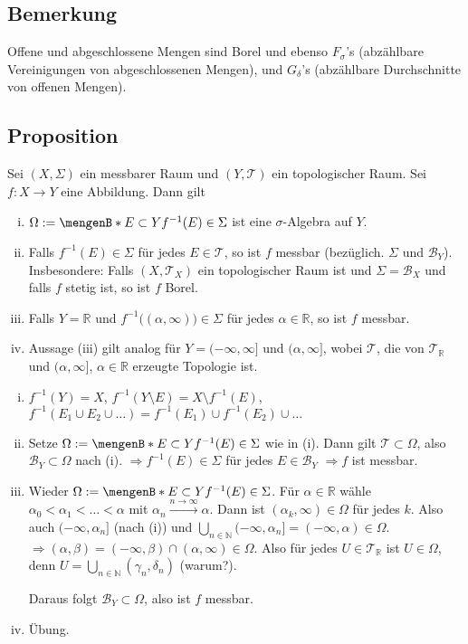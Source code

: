 \subsection[Bemerkung, welche Mengen Borel sind]{Bemerkung} %
\label{sub:97}
Offene und abgeschlossene Mengen sind Borel und ebenso $F_\sigma$'s (abzählbare Vereinigungen von abgeschlossenen Mengen), und $G_\delta$'s (abzählbare Durchschnitte von 
offenen Mengen).

\subsection[Proposition über Abbildungen zwischen topologischen und messbaren Räumen]{Proposition} %
\label{sub:98}
Sei $(X, \Sigma)$ ein messbarer Raum und $(Y, \mathcal{T} )$ ein topologischer Raum. Sei $f : X \to Y$ eine Abbildung. Dann gilt
\begin{enumerate}[(i)]
	\item $\Omega := \set[E \subset Y]{f ^{-1}(E) \in \Sigma} $ ist eine $\sigma$-Algebra auf $Y$.
	\item Falls $f ^{-1}(E) \in \Sigma$ für jedes $E \in \mathcal{T} $, so ist $f$ messbar (bezüglich. $\Sigma$ und $\mathcal{B}_Y$). Insbesondere: Falls 
	$(X, \mathcal{T}_X)$ ein topologischer Raum ist und $\Sigma = \mathcal{B}_X$ und falls $f$ stetig ist, so ist $f$ Borel.
	\item Falls $Y=\mathds{R}$ und $f ^{-1}\big( (\alpha, \infty)\big) \in \Sigma$ für jedes $\alpha \in \mathds{R}$, so ist $f$ messbar.
	\item Aussage (iii) gilt analog für $Y= (-\infty, \infty]$ und $(\alpha, \infty]$, wobei $\mathcal{T} $, die von $\mathcal{T}_\mathds{R}$ und $(\alpha, \infty]$, 
	$\alpha \in \mathds{R}$ erzeugte Topologie ist.
\end{enumerate}
\begin{enumerate}[(i)]
	\item $f ^{-1}(Y) =X$, $f ^{-1}(Y \setminus E) = X \setminus f ^{-1}(E)$, $f ^{-1}( E_1 \cup E_2 \cup \ldots ) = f ^{-1}(E_1) \cup f ^{-1}(E_2) \cup \ldots $
	\item Setze $\Omega := \set[E \subset Y]{f ^{-1}(E) \in \Sigma}$ wie in (i). Dann gilt $\mathcal{T}  \subset \Omega$, also $\mathcal{B}_Y \subset \Omega$ nach (i).
	$\Rightarrow f ^{-1}(E) \in \Sigma$ für jedes $E \in \mathcal{B}_Y$ $\Rightarrow f $ ist messbar.
	\item Wieder $\Omega := \set[E \subset Y]{f ^{-1}(E) \in \Sigma} $. Für $\alpha \in \mathds{R}$ wähle $\alpha_0 < \alpha_1 < \ldots < \alpha$ mit $\alpha_n \xrightarrow{n \to \infty} \alpha$. Dann ist $(\alpha_k, \infty) \in \Omega$ für jedes $k$. Also auch $(-\infty, \alpha_n]$ (nach (i)) und 
	$\bigcup_{n \in \mathds{N}} (-\infty, \alpha_n] = (- \infty, \alpha) \in \Omega$. $\Rightarrow (\alpha, \beta) = (- \infty, \beta) \cap (\alpha, \infty) \in \Omega$.
	Also für jedes $U \in \mathcal{T}_\mathds{R}$ ist $U \in \Omega$, denn $U= \bigcup_{n \in \mathds{N}} (\gamma_n, \delta_n)$ (warum?).
	
	Daraus folgt $\mathcal{B}_Y \subset \Omega$, also ist $f$ messbar.
	\item Übung. \bewende
\end{enumerate}
